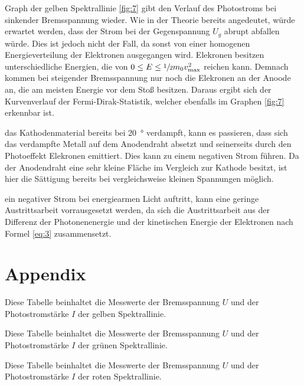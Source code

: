     \justifying Graph der gelben Spektrallinie \ref{fig:7} gibt den Verlauf des Photostroms bei sinkender Bremsspannung wieder. Wie in der Theorie bereits 
    angedeutet, würde erwartet werden, dass der Strom bei der Gegenspannung $U_g$ abrupt abfallen würde. Dies ist jedoch nicht der Fall, da sonst von einer homogenen Energieverteilung
    der Elektronen ausgegangen wird. Elekronen besitzen unterschiedliche Energien, die von $0\leq E \leq \sfrac{1}{2}m_0 v_{\text{max}}^2$ reichen kann. Demnach kommen bei steigender 
    Bremsspannung nur noch die Elekronen an der Anoode an, die am meisten Energie vor dem Stoß besitzen. Daraus ergibt sich der Kurvenverlauf der Fermi-Dirak-Statistik, welcher 
    ebenfalls im Graphen \ref{fig:7} erkennbar ist. 

    \justifying das Kathodenmaterial bereits bei \SI{20}{\degree} verdampft, kann es passieren, dass sich das verdampfte Metall auf dem Anodendraht absetzt und
    seinerseits durch den Photoeffekt Elekronen emittiert. Dies kann zu einem negativen Strom führen. Da der Anodendraht eine sehr kleine Fläche im Vergleich zur Kathode besitzt, 
    ist hier die Sättigung bereits bei vergleichsweise kleinen Spannungen möglich. 

    \justifying ein negativer Strom bei energiearmen Licht auftritt, kann eine geringe Austrittsarbeit vorrausgesetzt werden, da sich die Austrittsarbeit aus der 
    Differenz der Photonenenergie und der kinetischen Energie der Elektronen nach Formel \eqref{eq:3} zusammensetzt.

\newpage
\printbibliography

\newpage
\section*{Appendix}

\begin{table}[H]
    \centering
    \caption{Diese Tabelle beinhaltet die Messwerte der Bremsspannung $U$ und der Photostromstärke $I$ der gelben Spektrallinie.}
    
    \label{tab:1}
\end{table}

\begin{table}[H]
    \centering
    \caption{Diese Tabelle beinhaltet die Messwerte der Bremsspannung $U$ und der Photostromstärke $I$ der grünen Spektrallinie.}
    
    \label{tab:2}
\end{table}

\begin{table}[H]
    \centering
    \caption{Diese Tabelle beinhaltet die Messwerte der Bremsspannung $U$ und der Photostromstärke $I$ der roten Spektrallinie.}
    
    \label{tab:3}
\end{table}




